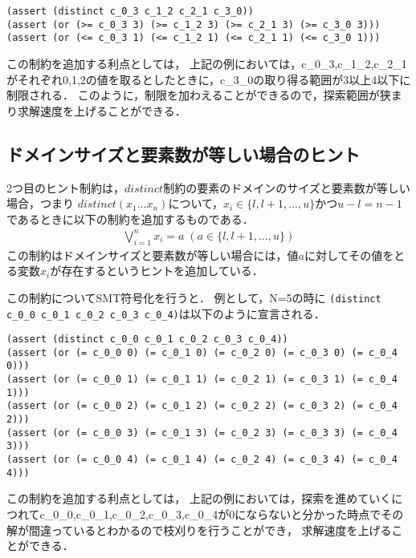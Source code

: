 \begin{verbatim}
(assert (distinct c_0_3 c_1_2 c_2_1 c_3_0))
(assert (or (>= c_0_3 3) (>= c_1_2 3) (>= c_2_1 3) (>= c_3_0 3)))
(assert (or (<= c_0_3 1) (<= c_1_2 1) (<= c_2_1 1) (<= c_3_0 1)))
\end{verbatim}

この制約を追加する利点としては，
上記の例においては，c\_0\_3,c\_1\_2,c\_2\_1がそれぞれ0,1,2の値を取るとしたときに，c\_3\_0の取り得る範囲が3以上4以下に制限される．
このように，制限を加わえることができるので，探索範囲が狭まり求解速度を上げることができる．


\subsection{ドメインサイズと要素数が等しい場合のヒント}
2つ目のヒント制約は，$distinct$制約の要素のドメインのサイズと要素数が等しい場合，つまり
$distinct(x_1 ... x_n)$について，$x_i \in \{l, l+1, ..., u\}$かつ$u-l=n-1$であるときに以下の制約を追加するものである．\\
\begin{eqnarray}
\bigvee_{i=1}^n x_i=a \; (a \in \{l, l+1, ..., u\})
\label{eq:h2}
\end{eqnarray}
この制約はドメインサイズと要素数が等しい場合には，値$a$に対してその値をとる変数$x_i$が存在するというヒントを追加している．

この制約についてSMT符号化を行うと．
例として，N=5の時に
\verb|(distinct c_0_0 c_0_1 c_0_2 c_0_3 c_0_4)|は以下のように宣言される．

\begin{verbatim}
(assert (distinct c_0_0 c_0_1 c_0_2 c_0_3 c_0_4))
(assert (or (= c_0_0 0) (= c_0_1 0) (= c_0_2 0) (= c_0_3 0) (= c_0_4 0)))
(assert (or (= c_0_0 1) (= c_0_1 1) (= c_0_2 1) (= c_0_3 1) (= c_0_4 1)))
(assert (or (= c_0_0 2) (= c_0_1 2) (= c_0_2 2) (= c_0_3 2) (= c_0_4 2)))
(assert (or (= c_0_0 3) (= c_0_1 3) (= c_0_2 3) (= c_0_3 3) (= c_0_4 3)))
(assert (or (= c_0_0 4) (= c_0_1 4) (= c_0_2 4) (= c_0_3 4) (= c_0_4 4)))
\end{verbatim}


この制約を追加する利点としては，
上記の例においては，探索を進めていくにつれてc\_0\_0,c\_0\_1,c\_0\_2,c\_0\_3,c\_0\_4が0にならないと分かった時点でその解が間違っているとわかるので枝刈りを行うことができ，
求解速度を上げることができる．



%
%
